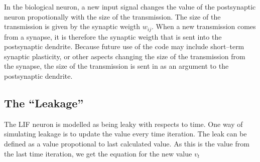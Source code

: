	In the biological neuron, a new input signal changes the value of the postsynaptic neuron propotionally with the size of the transmission.
	The size of the transmission is given by the synaptic weigth $w_{ij}$.
	When a new transmission comes from a synapse, it is therefore the synaptic weigth that is sent into the postsynaptic dendrite.
	Because future use of the code may include short--term synaptic plasticity, or other aspects changing the size of the transmission from the synapse, the size of the transmission is sent in as an argument to the postsynaptic dendrite.





%

	\subsection{The ``Leakage''}
	\label{secTheLeakageForSANN}

	The LIF neuron is modelled as being leaky with respects to time. %
	One way of simulating leakage is to update the value every time iteration. %
	The leak can be defined as a value propotional to last calculated value.
	As this is the value from the last time iteration, we get the equation for the new value $v_t$
	
